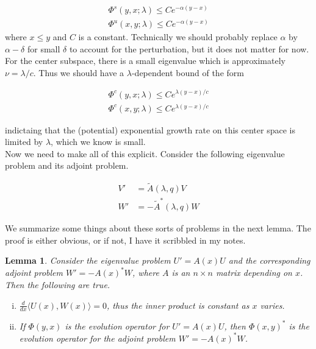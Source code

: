 \documentclass[12pt]{article}
\newtheorem{lemma}{Lemma}
\begin{document}
\begin{align*}
\Phi^s(y, x; \lambda) \leq C e^{-\alpha(y-x)} \\
\Phi^u(x, y; \lambda) \leq C e^{-\alpha(y-x)}
\end{align*}
where $x \leq y$ and $C$ is a constant. Technically we should probably replace $\alpha$ by $\alpha - \delta$ for small $\delta$ to account for the perturbation, but it does not matter for now.\\

For the center subspace, there is a small eigenvalue which is approximately $\nu = \lambda / c$. Thus we should have a $\lambda$-dependent bound of the form

\begin{align*}
\Phi^c(y, x; \lambda) \leq C e^{\lambda(y-x)/c} \\
\Phi^c(x, y; \lambda) \leq C e^{\lambda(y-x)/c}
\end{align*}

indictaing that the (potential) exponential growth rate on this center space is limited by $\lambda$, which we know is small.\\

Now we need to make all of this explicit. Consider the following eigenvalue problem and its adjoint problem.

\begin{align}
V' &= \tilde{A}(\lambda, q)V \label{eig:V} \\
W' &= -\tilde{A}^*(\lambda, q)W \label{eig:W}
\end{align}

We summarize some things about these sorts of problems in the next lemma. The proof is either obvious, or if not, I have it scribbled in my notes.

\begin{lemma}\label{eigadjoint}
Consider the eigenvalue problem $U' = A(x)U$ and the corresponding adjoint problem $W' = -A(x)^* W$, where $A$ is an $n \times n$ matrix depending on $x$. Then the following are true.
\begin{enumerate}[(i)]
\item $\frac{d}{dx}\langle U(x), W(x) \rangle = 0$, thus the inner product is constant as $x$ varies.
\item If $\Phi(y, x)$ is the evolution operator for $U' = A(x)U$, then $\Phi(x, y)^*$ is the evolution operator for the adjoint problem $W' = -A(x)^* W$.
\end{enumerate}
\end{lemma}
\end{document}
